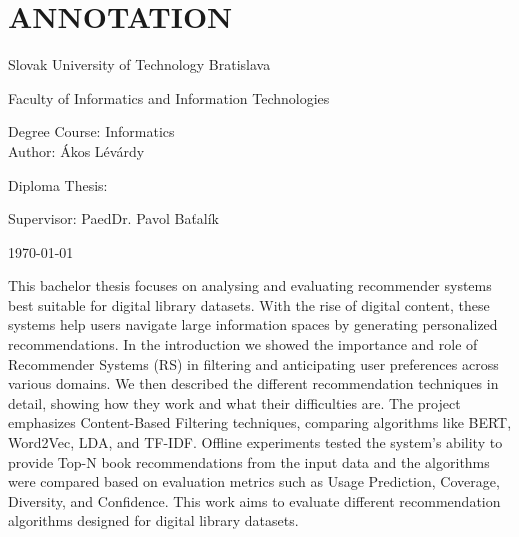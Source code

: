\documentclass[\myFontSize,oneside,english,hidelinks,a4paper]{article}
\begin{document}
\titleformat{\section}{\LARGE\bfseries}{\thesection}{1em}{}
\titleformat{\subsection}{\Large\bfseries}{\thesubsection}{1em}{}
\titleformat{\subsubsection}{\Large\bfseries}{\thesubsubsection}{1em}{}

%
%

\newpage{}
\thispagestyle{empty}
\mbox{}

\newpage{} 
\thispagestyle{empty}
\section*{ANNOTATION}
\begin{minipage}[t]{1\columnwidth}%
Slovak University of Technology Bratislava 

Faculty of Informatics and Information Technologies

Degree Course: Informatics\\

Author: Ákos Lévárdy

Diploma Thesis: \thesisTitle

Supervisor: PaedDr. Pavol Baťalík

\today%
\end{minipage}
\bigskip{}

This bachelor thesis focuses on analysing and evaluating recommender systems best suitable for digital library datasets. With the rise of digital content, these systems help users navigate large information spaces by generating personalized recommendations. In the introduction we showed the importance and role of Recommender Systems (RS) in filtering and anticipating user preferences across various domains. We then described the different recommendation techniques in detail, showing how they work and what their difficulties are. The project emphasizes Content-Based Filtering techniques, comparing algorithms like BERT, Word2Vec, LDA, and TF-IDF. Offline experiments tested the system’s ability to provide Top-N book recommendations from the input data and the algorithms were compared based on evaluation metrics such as Usage Prediction, Coverage, Diversity, and Confidence. This work aims to evaluate different recommendation algorithms designed for digital library datasets.
\end{document}
